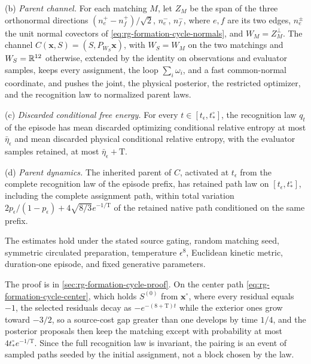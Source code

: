 (b) \emph{Parent channel.} For each matching \(M\), let \(Z_M\) be the span of
the three orthonormal directions
\((n^+_{e}-n^+_{f})/\sqrt2\), \(n^-_{e}\), \(n^-_{f}\), where \(e,f\) are its
two edges, \(n^\pm_e\) the unit normal covectors of
\cref{eq:rg-formation-cycle-normals}, and \(W_M=Z_M^\perp\). The channel
\(C(\mathbf x,S)=(S,P_{W_S}\mathbf x)\), with \(W_S=W_M\) on the two matchings
and \(W_S=\mathbb R^{12}\) otherwise, extended by the identity on observations and
evaluator samples, keeps every assignment, the loop
\(\sum_i\omega_i\), and a fast common-normal coordinate, and pushes the joint,
the physical posterior, the restricted optimizer, and the recognition law to
normalized parent laws.

(c) \emph{Discarded conditional free energy.} For every
\(t\in[t_\epsilon,t^\circ_*]\), the recognition law \(q_t\) of the episode
has mean discarded optimizing conditional relative entropy at most
\(\bar\eta_\epsilon\) and mean discarded physical conditional relative entropy,
with the evaluator samples retained, at most \(\bar\eta_\epsilon+\mathrm T\).

(d) \emph{Parent dynamics.} The inherited parent of \(C\), activated at
\(t_\epsilon\) from the complete recognition law of the episode prefix, has
retained path law on \([t_\epsilon,t^\circ_*]\), including the complete
assignment path, within total variation
\(2p_\epsilon/(1-p_\epsilon)+4\sqrt{8/3} e^{-1/\mathrm T}\) of the retained
native path conditioned on the same prefix.

The estimates hold under the stated source gating, random matching seed,
symmetric circulated preparation, temperature \(\epsilon^8\), Euclidean
kinetic metric, duration-one episode, and fixed generative parameters.

The proof is in \cref{sec:rg-formation-cycle-proof}. On the center path
\cref{eq:rg-formation-cycle-center}, which holds \(S^{(0)}\) from
\(\mathbf x^\circ\), where every residual equals \(-1\), the selected
residuals decay as \(-e^{-(8+\mathrm T)t}\) while the exterior ones grow
toward \(-3/2\), so a source-cost gap greater than one develops by time
\(1/4\), and the posterior proposals then keep the matching except with
probability at most \(4t^\circ_*e^{-1/\mathrm T}\). Since the full
recognition law is invariant, the pairing is an event of sampled paths seeded
by the initial assignment, not a block chosen by the law.

